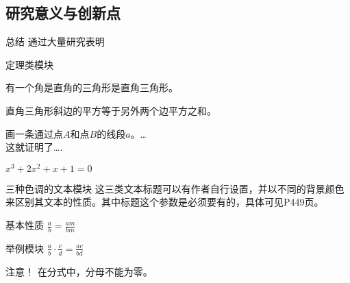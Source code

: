 \documentclass[14pt,hyperref={CJKbookmarks=true}]{beamer} %
\begin{document}
\subsection{研究意义与创新点}
\begin{frame}{总结}
    通过大量研究表明
\end{frame}
\begin{frame}{定理类模块}
    \begin{DEfinition}
        有一个角是直角的三角形是直角三角形。
    \end{DEfinition}
    \begin{THeorem}
        直角三角形斜边的平方等于另外两个边平方之和。
    \end{THeorem}
    \begin{PRoof}
        画一条通过点$A$和点$B$的线段$a$。\dots \\
        这就证明了\dots.    %
    \end{PRoof}
    \begin{EXample}
        $x^{3}+2x^{2}+x+1=0$
    \end{EXample}
\end{frame}
\begin{frame}{三种色调的文本模块}
    这三类文本标题可以有作者自行设置，并以不同的背景颜色来区别其文本的性质。其中标题这个参数是必须要有的，具体可见P449页。
    \begin{block}{基本性质}
        $\frac{a}{b}=\frac{am}{bm}$
    \end{block}
    \begin{exampleblock}{举例模块}
        $\frac{a}{b}\cdot\frac{c}{d}=\frac{ac}{bd}$
    \end{exampleblock}
    \begin{alertblock}{\heiti 注意！}
        在分式中，分母不能为零。
    \end{alertblock}
\end{frame}
\end{document}
